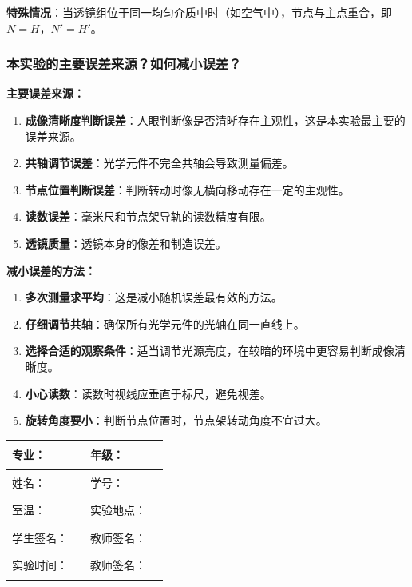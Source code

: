 \documentclass[dvipsnames, svgnames,a4paper,11pt]{article}
\begin{document}
\textbf{特殊情况}：当透镜组位于同一均匀介质中时（如空气中），节点与主点重合，即$N=H$，$N'=H'$。

\subsubsection{本实验的主要误差来源？如何减小误差？}
	\textbf{主要误差来源：}
	\begin{enumerate}
		\item \textbf{成像清晰度判断误差}：人眼判断像是否清晰存在主观性，这是本实验最主要的误差来源。
		\item \textbf{共轴调节误差}：光学元件不完全共轴会导致测量偏差。
		\item \textbf{节点位置判断误差}：判断转动时像无横向移动存在一定的主观性。
		\item \textbf{读数误差}：毫米尺和节点架导轨的读数精度有限。
		\item \textbf{透镜质量}：透镜本身的像差和制造误差。
	\end{enumerate}
	
	\textbf{减小误差的方法：}
	\begin{enumerate}
		\item \textbf{多次测量求平均}：这是减小随机误差最有效的方法。
		\item \textbf{仔细调节共轴}：确保所有光学元件的光轴在同一直线上。
		\item \textbf{选择合适的观察条件}：适当调节光源亮度，在较暗的环境中更容易判断成像清晰度。
		\item \textbf{小心读数}：读数时视线应垂直于标尺，避免视差。
		\item \textbf{旋转角度要小}：判断节点位置时，节点架转动角度不宜过大。
	\end{enumerate}

\clearpage
\begin{table}
	\renewcommand\arraystretch{1.7}
	\centering
	\begin{tabularx}{\textwidth}{|X|X|X|X|}
	\hline
	专业：& \rule{2.5cm}{0.4pt} & 年级：& \rule{2.5cm}{0.4pt}\\
	\hline
	姓名：& \rule{2.5cm}{0.4pt} & 学号：& \rule{2.5cm}{0.4pt}\\
	\hline
	室温：& \rule{2.5cm}{0.4pt} & 实验地点：& \rule{2.5cm}{0.4pt}\\
	\hline
	学生签名：& \rule{2.5cm}{0.4pt} & 教师签名：& \rule{2.5cm}{0.4pt}\\
	\hline
	实验时间：& \rule{2.5cm}{0.4pt} & 教师签名：& \rule{2.5cm}{0.4pt}\\
	\hline
	\end{tabularx}
\end{table}
\end{document}
